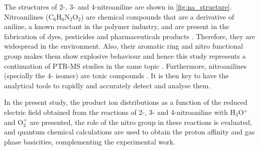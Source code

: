 
The structures of 2-, 3- and 4-nitroaniline are shown in \autoref{fig:na_structure}. Nitroanilines (C$_6$H$_6$N$_2$O$_2$) are  chemical compounds that are a derivative of aniline, a known reactant in the polymer industry, and are present in the fabrication of dyes, pesticides and pharmaceuticals products \cite{ullmannnitros,yuan2015nitrogen}. 
Therefore, they are widespread in the environment. Also, their aromatic ring and nitro functional group makes them show explosive behaviour and hence this study represents a continuation of  PTR-MS studies in the same topic \cite{mayhew2010applications,sulzer2012proton,kassebacher2013investigations,RN445,jurschik2010proton,sulzer2013applications,agarwal2014sensitivity,RF_TNT,gonzalez2017development,doi:10.1021/acs.analchem.7b05211,doi:10.1002/rcm.4334,gonzalez2019applications}. 
Furthermore, nitroanilines (specially the 4- isomer) are toxic compounds 
\cite{lu2018rapid}. 
It is then key to have the analytical tools to rapidly and accurately detect and analyse them.


In the present study, the product ion distributions as a function of the reduced electric field obtained from the reactions of 2-, 3- and 4-nitroaniline with H$_3$O$^+$ and O$_2^+$ are presented, the role of the nitro group in these reactions is evaluated, and quantum chemical calculations are used to obtain the proton affinity and gas phase basicities, complementing the experimental work. 




